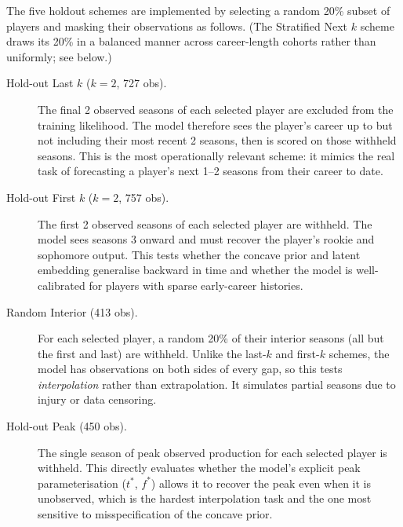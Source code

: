 The five holdout schemes are implemented by selecting a random 20\% subset of players and masking their observations as follows. (The Stratified Next $k$ scheme draws its 20\% in a balanced manner across career-length cohorts rather than uniformly; see below.)

\begin{description}
  \item[Hold-out Last $k$ ($k{=}2$, 727 obs).] The final 2 observed seasons of each selected player are excluded from the training likelihood. The model therefore sees the player's career up to but not including their most recent 2 seasons, then is scored on those withheld seasons. This is the most operationally relevant scheme: it mimics the real task of forecasting a player's next 1--2 seasons from their career to date.

  \item[Hold-out First $k$ ($k{=}2$, 757 obs).] The first 2 observed seasons of each selected player are withheld. The model sees seasons 3 onward and must recover the player's rookie and sophomore output. This tests whether the concave prior and latent embedding generalise backward in time and whether the model is well-calibrated for players with sparse early-career histories.

  \item[Random Interior (413 obs).] For each selected player, a random 20\% of their interior seasons (all but the first and last) are withheld. Unlike the last-$k$ and first-$k$ schemes, the model has observations on both sides of every gap, so this tests \emph{interpolation} rather than extrapolation. It simulates partial seasons due to injury or data censoring.

  \item[Hold-out Peak (450 obs).] The single season of peak observed production for each selected player is withheld. This directly evaluates whether the model's explicit peak parameterisation ($t^*$, $f^*$) allows it to recover the peak even when it is unobserved, which is the hardest interpolation task and the one most sensitive to misspecification of the concave prior.


\end{description}
